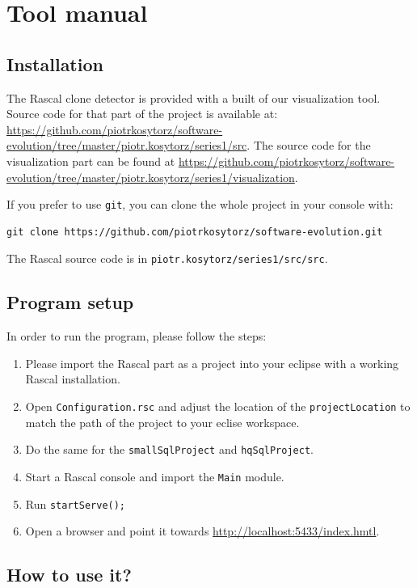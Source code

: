 \documentclass{uva-inf-article}
\begin{document}
\section{Tool manual}

\subsection{Installation}

The Rascal clone detector is provided with a built of our visualization tool. Source code for that part of the project is available at: \url{https://github.com/piotrkosytorz/software-evolution/tree/master/piotr.kosytorz/series1/src}. The source code for the visualization part can be found at \url{https://github.com/piotrkosytorz/software-evolution/tree/master/piotr.kosytorz/series1/visualization}.

If you prefer to use \texttt{git}, you can clone the whole project in your console with:

\begin{verbatim}
git clone https://github.com/piotrkosytorz/software-evolution.git
\end{verbatim}

The Rascal source code is in \texttt{piotr.kosytorz/series1/src/src}.

\subsection{Program setup}

In order to run the program, please follow the steps:

\begin{enumerate}
\item Please import the Rascal part as a project into your eclipse with a working Rascal installation.
\item
  Open \texttt{Configuration.rsc} and adjust the location of the \texttt{projectLocation} to match the path of the project to your eclise workspace.
\item Do the same for the \texttt{smallSqlProject} and \texttt{hqSqlProject}.
\item Start a Rascal console and import the \texttt{Main} module.
\item Run \texttt{startServe();}
\item Open a browser and point it towards \url{http://localhost:5433/index.hmtl}.
\end{enumerate}

\subsection{How to use it?}
\end{document}
